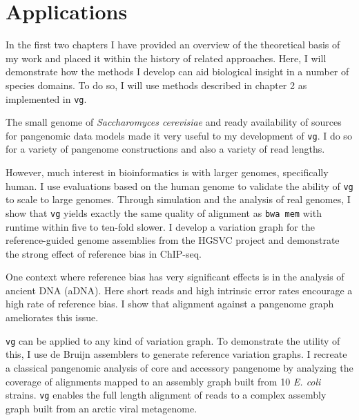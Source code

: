 \chapter{Applications}

\ifpdf
    \graphicspath{{Chapter3/Figs/Raster/}{Chapter3/Figs/PDF/}{Chapter3/Figs/}}
\else
    \graphicspath{{Chapter3/Figs/Vector/}{Chapter3/Figs/}}
\fi

In the first two chapters I have provided an overview of the theoretical basis of my work and placed it within the history of related approaches.
Here, I will demonstrate how the methods I develop can aid biological insight in a number of species domains.
To do so, I will use methods described in chapter 2 as implemented in {\tt vg}.

The small genome of \emph{Saccharomyces cerevisiae} and ready availability of sources for pangenomic data models made it very useful to my development of {\tt vg}.
I do so for a variety of pangenome constructions and also a variety of read lengths.

However, much interest in bioinformatics is with larger genomes, specifically human.
I use evaluations based on the human genome to validate the ability of {\tt vg} to scale to large genomes.
Through simulation and the analysis of real genomes, I show that {\tt vg} yields exactly the same quality of alignment as {\tt bwa mem} with runtime within five to ten-fold slower.
I develop a variation graph for the reference-guided genome assemblies from the HGSVC project and demonstrate the strong effect of reference bias in ChIP-seq.

One context where reference bias has very significant effects is in the analysis of ancient DNA (aDNA).
Here short reads and high intrinsic error rates encourage a high rate of reference bias.
I show that alignment against a pangenome graph ameliorates this issue.

{\tt vg} can be applied to any kind of variation graph.
To demonstrate the utility of this, I use de Bruijn assemblers to generate reference variation graphs.
I recreate a classical pangenomic analysis of core and accessory pangenome by analyzing the coverage of alignments mapped to an assembly graph built from 10 \emph{E. coli} strains.
{\tt vg} enables the full length alignment of reads to a complex assembly graph built from an arctic viral metagenome.

